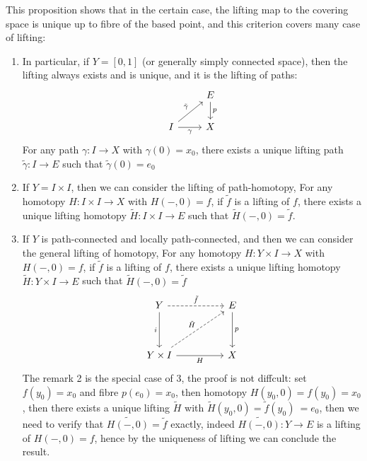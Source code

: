 \begin{remark}
    This proposition shows that in the certain case, the lifting map to the covering space is unique up to fibre of the based point, and this criterion covers many case of lifting:
    \begin{enumerate}
        \item In particular, if \(Y=[0,1]\) (or generally simply connected space), then the lifting always exists and is unique, and it is the lifting of paths:
\[\begin{tikzcd}
	& E \\
	I & X
	\arrow["p", from=1-2, to=2-2]
	\arrow["{\tilde{\gamma}}", from=2-1, to=1-2]
	\arrow["\gamma"', from=2-1, to=2-2]
\end{tikzcd}\]
        For any path \(\gamma: I \to X\) with \(\gamma(0) = x_0\), there exists a unique lifting path \(\tilde{\gamma}: I \to E\) such that \(\tilde{\gamma}(0) = e_0\)
       
        \item If \(Y= I \times I\), then we can consider the lifting of path-homotopy, For any homotopy \(H: I \times I \to X\) with \(H(-,0) = f\), if \(\tilde{f}\) is a lifting of \(f\), there exists a unique lifting homotopy \(\tilde{H}: I \times I \to E\) such that \(\tilde{H}(-,0) = \tilde{f}\).
        
        \item If \(Y\) is path-connected and locally path-connected, and then we can consider the general lifting of homotopy, For any homotopy \(H: Y \times I \to X\) with \(H(-,0) = f\), if \(\tilde{f}\) is a lifting of \(f\), there exists a unique lifting homotopy \(\tilde{H}: Y \times I \to E\) such that \(\tilde{H}(-,0) = \tilde{f}\)
\[\begin{tikzcd}
	Y && E \\
	\\
	{Y\times I} && X
	\arrow["{\tilde{f}}", dashed, from=1-1, to=1-3]
	\arrow["i"', from=1-1, to=3-1]
	\arrow["p", from=1-3, to=3-3]
	\arrow["{\tilde{H}}", dashed, from=3-1, to=1-3]
	\arrow["H"', from=3-1, to=3-3]
\end{tikzcd}\]
    The remark 2 is the special case of 3, the proof is not diffcult: set \(f(y_0) = x_0\) and fibre \(p(e_0) = x_0\), then homotopy \(H(y_0,0) = f(y_0) = x_0\), then there exists a unique lifting \(\tilde{H}\) with \(\tilde{H}(y_0,0) = \tilde{f}(y_0)\ = e_0\), then we need to verify that \(\tilde{H(-,0)} = \tilde{f}\) exactly, indeed \(\tilde{H(-,0)}:Y \to E\) is a lifting of \(H(-,0) = f\), hence by the uniqueness of lifting we can conclude the result.
    \end{enumerate}
\end{remark}

